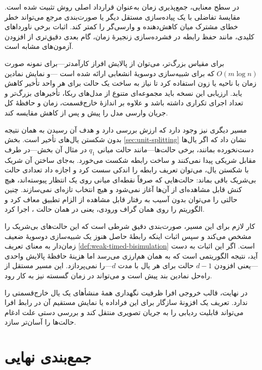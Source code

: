 در سطح معنایی، جمع‌پذیری زمان به‌عنوان قرارداد اصلی روش تثبیت شده است. مقایسهٔ تفاضلی با یک پیاده‌سازی مستقل دیگر یا صورت‌بندی مرجع می‌تواند خطر خطای مشترک میان کاهش‌دهنده و وارسی‌گر را کمتر کند. اثبات برخی ناورداهای کلیدی، مانند حفظ رابطه در فشرده‌سازی زنجیرهٔ زمان، گام بعدی دقیق‌تری از افزودن آزمون‌های مشابه است.

برای مقیاس بزرگ‌تر، می‌توان از پالایش افراز کارآمدتر—برای نمونه صورت $O(m\log n)$ که برای شبیه‌سازی دوسویهٔ انشعابی ارائه شده است \cite{GrooteEtAl2017}—و نمایش نمادین زمان با ناحیه یا زون استفاده کرد تا نیاز به ساخت یک حالت برای هر واحد تأخیر کاهش یابد. ارزیابی این نسخه باید مجموعه‌ای متنوع از مدل‌های ربکا، تأخیرهای بزرگ‌تر و تعداد اجرای تکراری داشته باشد و علاوه بر اندازهٔ خارج‌قسمت، زمان و حافظهٔ کل جریان وارسی مدل را پیش و پس از کاهش مقایسه کند.

مسیر دیگری نیز وجود دارد که ارزش بررسی دارد و هدف آن رسیدن به همان نتیجه بدون شکستن یال‌های تأخیر است. بخش \ref{sec:unit-splitting} نشان داد که اگر یال‌ها دست‌نخورده بمانند، برخی حالت‌ها—مانند حالت میانی $q_1$ در مثال آن بخش—در طرف مقابل شریکی پیدا نمی‌کنند و ساخت رابطه شکست می‌خورد. به‌جای ساختن آن شریک با شکستن یال، می‌توان تعریف رابطه را اندکی سست کرد و اجازه داد تعدادی حالت بی‌شریک باقی بماند: حالت‌هایی که صرفاً نقطه‌ای میانی روی یک انتظار پیوسته‌اند، هیچ کنش قابل مشاهده‌ای از آن‌ها آغاز نمی‌شود و هیچ انتخاب تازه‌ای نمی‌سازند. چنین حالتی را می‌توان بدون آسیب به رفتار قابل مشاهده از الزام تطبیق معاف کرد و الگوریتم را روی همان گراف ورودی، یعنی در همان حالت ، اجرا کرد.

کار لازم برای این مسیر، صورت‌بندی دقیق شرطی است که این حالت‌های بی‌شریک را مشخص می‌کند و سپس اثبات اینکه رابطهٔ حاصل هنوز یک شبیه‌سازی دوسویهٔ ضعیف زمان‌دار به معنای تعریف \ref{def:weak-timed-bisimulation} است. اگر این اثبات به دست آید، نتیجه الگوریتمی است که به همان هم‌ارزی می‌رسد اما هزینهٔ حافظهٔ پالایش واحدی—یعنی افزودن $d-1$ حالت برای هر یال با مدت $d$—را نمی‌پردازد. این مسیر مستقل از راه‌حل نمادین بند پیش است و می‌تواند در زمان گسسته نیز به کار رود.

در نهایت، قالب خروجی افرا ظرفیت نگهداری همهٔ منشأهای یک یال خارج‌قسمتی را ندارد. تعریف یک افزونهٔ سازگار برای این فراداده یا نمایش مستقیم آن در رابط افرا می‌تواند قابلیت ردیابی  را به جریان تصویری منتقل کند و بررسی دستی علت ادغام حالت‌ها را آسان‌تر سازد.

\section{جمع‌بندی نهایی}

